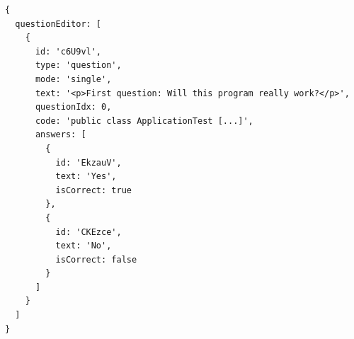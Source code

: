 \begin{minipage}{\linewidth}
\begin{lstlisting}[caption={Zustand des Fragen-Editors innerhalb des Redux-Store mit einer einzigen Frage.}]
{
  questionEditor: [
    {
      id: 'c6U9vl',
      type: 'question',
      mode: 'single',
      text: '<p>First question: Will this program really work?</p>',
      questionIdx: 0,
      code: 'public class ApplicationTest [...]',
      answers: [
        {
          id: 'EkzauV',
          text: 'Yes',
          isCorrect: true
        },
        {
          id: 'CKEzce',
          text: 'No',
          isCorrect: false
        }
      ]
    }
  ]
}
\end{lstlisting}
\end{minipage}